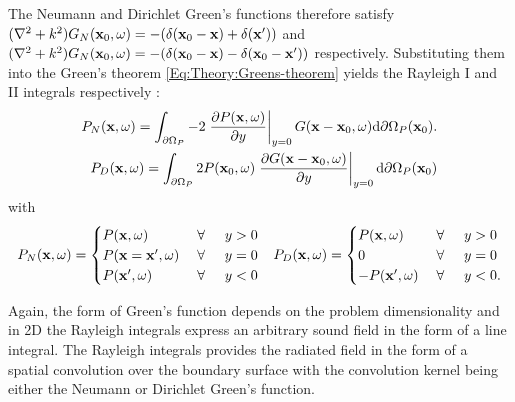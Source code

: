 The Neumann and Dirichlet Green's functions therefore satisfy $(\nabla^2+k^2)G_N(\mathbf{x}_0,\omega) = -(\delta(\mathbf{x}_0-\mathbf{x}) + \delta(\mathbf{x}'))$ and $(\nabla^2+k^2)G_N(\mathbf{x}_0,\omega) = -(\delta(\mathbf{x}_0-\mathbf{x})  - \delta(\mathbf{x}_0-\mathbf{x}'))$ respectively. Substituting them into the Green's theorem \eqref{Eq:Theory:Greens-theorem} yields the Rayleigh I and II integrals respectively \cite{Berkhout1984}:
\begin{eqnarray}
P_N(\mathbf{x},\omega) =
\int_{\partial \Omega_P}
-2
\left. \frac{\partial P(\mathbf{x},\omega)}{\partial y} \right|_{y = 0} 
G(\mathbf{x}-\mathbf{x}_0,\omega) \mathrm{d} \partial \Omega_P ( \mathbf{x}_0).
\\
P_D(\mathbf{x},\omega) =
\int_{\partial \Omega_P}
2 P(\mathbf{x}_0,\omega)  
\left. \frac{\partial G(\mathbf{x}-\mathbf{x}_0,\omega)}{\partial y} \right|_{y = 0} 
\mathrm{d} \partial \Omega_P ( \mathbf{x}_0)
\label{Eq:Theory:RayleighI_II}
\end{eqnarray}
with
\begin{align*}
P_N(\mathbf{x},\omega) = \begin{cases} 
P(\mathbf{x},\omega)           & \hspace{1mm} \forall \hspace{5mm}  y>0  	     \\
P(\mathbf{x} = \mathbf{x}',\omega) 			& \hspace{1mm} \forall \hspace{5mm}  y=0  \\
P(\mathbf{x}',\omega) 			& \hspace{1mm} \forall \hspace{5mm}  y<0
\end{cases}
&&
P_D(\mathbf{x},\omega) = \begin{cases} 
P(\mathbf{x},\omega)           & \hspace{1mm} \forall \hspace{5mm}  y>0  	     \\
0 			& \hspace{1mm} \forall \hspace{5mm}  y=0  \\
-P(\mathbf{x}',\omega) 			& \hspace{1mm} \forall \hspace{5mm}  y<0.
\end{cases}
\end{align*}

Again, the form of Green's function depends on the problem dimensionality and in 2D the Rayleigh integrals express an arbitrary sound field in the form of a line integral.
The Rayleigh integrals provides the radiated field in the form of a spatial convolution over the boundary surface with the convolution kernel being either the Neumann or Dirichlet Green's function.

